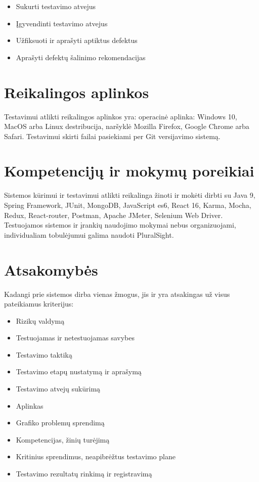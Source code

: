 \begin{itemize}
	\item Sukurti testavimo atvejus
	\item Įgyvendinti testavimo atvejus
	\item Užfiksuoti ir aprašyti aptiktus defektus
	\item Aprašyti defektų šalinimo rekomendacijas
\end{itemize}

\section{Reikalingos aplinkos}

Testavimui atlikti reikalingos aplinkos yra: operacinė aplinka: Windows 10, MacOS arba Linux destribucija, naršyklė Mozilla Firefox, Google Chrome arba Safari. 
Testavimui skirti failai pasiekiami per Git versijavimo sistemą. 

\section{Kompetencijų ir mokymų poreikiai}

Sistemos kūrimui ir testavimui atlikti reikalinga žinoti ir mokėti dirbti su Java 9, Spring Framework, JUnit,
 MongoDB, JavaScript es6, React 16, Karma, Mocha, Redux, React-router, Postman, Apache JMeter, Selenium Web Driver. 
Testuojamos sistemos ir įrankių naudojimo mokymai nebus organizuojami, individualiam tobulėjumui galima naudoti PluralSight.

\section{Atsakomybės}

Kadangi prie sistemos dirba vienas žmogus, jis ir yra atsakingas už visus pateikiamus kriterijus: 

\begin{itemize}
	\item Rizikų valdymą
	\item Testuojamas ir netestuojamas savybes
	\item Testavimo taktiką
	\item Testavimo etapų nustatymą ir aprašymą
	\item Testavimo atvejų sukūrimą
	\item Aplinkas
	\item Grafiko problemų sprendimą
	\item Kompetencijas, žinių turėjimą
	\item Kritinius sprendimus, neapibrėžtus testavimo plane
	\item Testavimo rezultatų rinkimą ir registravimą
\end{itemize}

